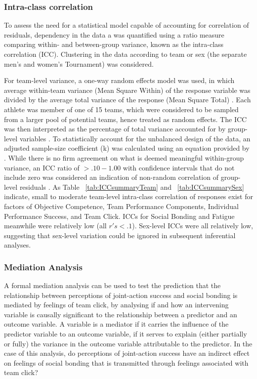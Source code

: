 \subsubsection{Intra-class correlation}
To assess the need for a statistical model capable of accounting for correlation of residuals, dependency in the data a was quantified using a ratio measure comparing within- and between-group variance, known as the intra-class correlation (ICC). Clustering in the data according to team or sex (the separate men's and women's Tournament) was considered.

For team-level variance, a one-way random effects model was used, in which average within-team variance (Mean Square Within) of the response variable was divided by the average total variance of the response (Mean Square Total) \citep{Field2005a}.  Each athlete was member of one of 15 teams, which were considered to be sampled from a larger pool of potential teams, hence treated as random effects. The ICC was then interpreted as the percentage of total variance accounted for by group-level variables \citep{Wolak2012}.
To statistically account for the unbalanced design of the data, an adjusted sample-size coefficient (k) was calculated using an equation provided by \citep{Lessells1987}.  While there is no firm agreement on what is deemed meaningful within-group variance, an ICC ratio of $>.10-1.00$ with confidence intervals that do not include zero was considered an indication of non-random correlation of group-level residuals \citep{Bailey2011}. As Table ~\ref{tab:ICCsummaryTeam} and ~\ref{tab:ICCsummarySex} indicate, small to moderate team-level intra-class correlation of responses exist for factors of Objective Competence, Team Performance Components, Individual Performance Success, and Team Click.  ICCs for Social Bonding and Fatigue meanwhile were relatively low (all $r's <.1$). Sex-level ICCs were all relatively low, suggesting that sex-level variation could be ignored in subsequent inferential analyses.\\



\subsubsection{Mediation Analysis\label{app8:mediationAnalysis}}
A formal mediation analysis can be used to test the prediction that the relationship between perceptions of joint-action success and social bonding is mediated by feelings of team click, by analysing if and how an intervening variable is causally significant to the relationship between a predictor and an outcome variable. A variable is a mediator if it carries the influence of the predictor variable to an outcome variable, if it serves to explain (either partially or fully) the variance in the outcome variable attributable to the predictor. In the case of this analysis, do perceptions of joint-action success have an indirect effect on feelings of social bonding that is transmitted through feelings associated with team click?

